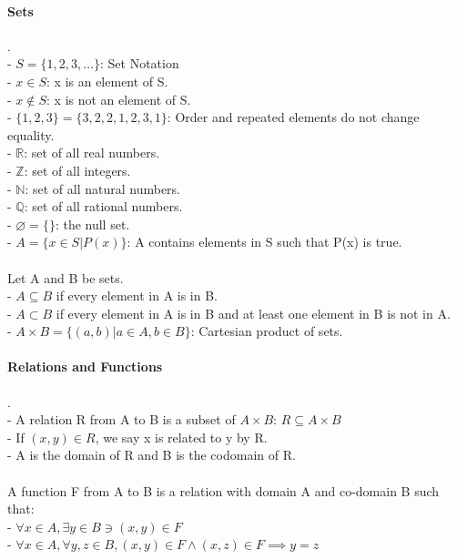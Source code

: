 \documentclass[10pt,letterpaper]{article}
\begin{document}
\begin{multicols}{2}

\paragraph*{Sets}.\\
- $S = \{1,2,3,\dots\}$: Set Notation\\
- $x \in S$: x is an element of S.\\
- $x \notin S$: x is not an element of S.\\
- $\{1,2,3\}=\{3,2,2,1,2,3,1\}$: Order and repeated elements do not change equality.\\
- $\mathbb{R}$: set of all real numbers.\\
- $\mathbb{Z}$: set of all integers.\\
- $\mathbb{N}$: set of all natural numbers.\\
- $\mathbb{Q}$: set of all rational numbers.\\
- $\varnothing = \{\}$: the null set.\\
- $A = \{x \in S | P(x)\}$: A contains elements in S such that P(x) is true.\\
\\
Let A and B be sets.\\
- $A \subseteq B$ if every element in A is in B.\\
- $A \subset B$ if every element in A is in B and at least one element in B is not in A.\\
- $A \times B = \{(a,b) | a \in A, b \in B\}$: Cartesian product of sets.

\paragraph*{Relations and Functions}.\\
- A relation R from A to B is a subset of $A \times B$: $R \subseteq A \times B$\\
- If $(x,y) \in R$, we say x is related to y by R.\\
- A is the domain of R and B is the codomain of R.\\
\\
A function F from A to B is a relation with domain A and co-domain B such that:\\
- $\forall x \in A, \exists y \in B \ni (x,y) \in F$\\
- $\forall x \in A, \forall y,z \in B, (x,y) \in F \land (x,z) \in F \implies y=z$


\end{multicols}
\end{document}
